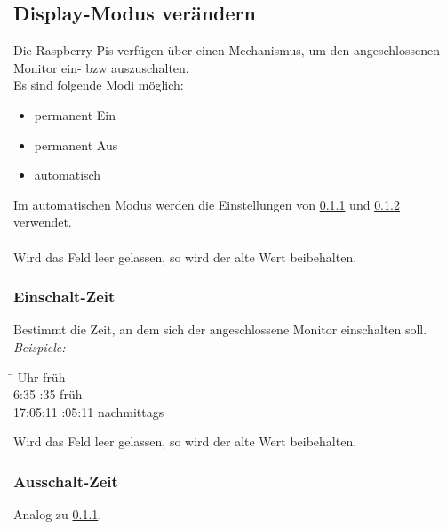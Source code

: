 \subsection{Display-Modus verändern}

Die Raspberry Pis verfügen über einen Mechanismus, um den angeschlossenen Monitor ein- bzw auszuschalten.\\
Es sind folgende Modi möglich:
\begin{itemize}
	\item permanent Ein
	\item permanent Aus
	\item automatisch
\end{itemize}
Im automatischen Modus werden die Einstellungen von \ref{instr_admin_moni_time_on} und \ref{instr_admin_moni_time_off} verwendet.\\
\\
Wird das Feld leer gelassen, so wird der alte Wert beibehalten.\\

\subsubsection{Einschalt-Zeit}
\label{instr_admin_moni_time_on}

Bestimmt die Zeit, an dem sich der angeschlossene Monitor einschalten soll.\\
\textit{Beispiele:}
\begin{tabbing}
\hspace{2cm}\=  Uhr früh\\ 
6:35 :35 früh\\
17:05:11 :05:11 nachmittags
\end{tabbing}
Wird das Feld leer gelassen, so wird der alte Wert beibehalten.\\

\subsubsection{Ausschalt-Zeit}
\label{instr_admin_moni_time_off}

Analog zu \ref{instr_admin_moni_time_on}.
